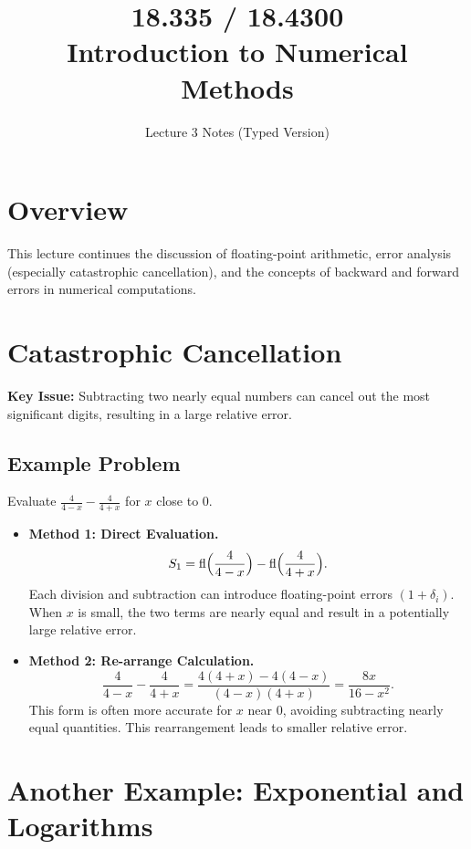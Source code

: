 \documentclass[12pt]{article}
\begin{document}
\title{18.335 / 18.4300 \\ Introduction to Numerical Methods}
\author{Lecture 3 Notes (Typed Version)}
\date{}
\maketitle

\section*{Overview}

This lecture continues the discussion of floating-point arithmetic, error analysis (especially catastrophic cancellation), and the concepts of backward and forward errors in numerical computations.

\section*{Catastrophic Cancellation}

\noindent
\textbf{Key Issue:} Subtracting two nearly equal numbers can cancel out the most significant digits, resulting in a large relative error.

\subsection*{Example Problem}

Evaluate $\displaystyle \frac{4}{4 - x} - \frac{4}{4 + x}$ for $x$ close to $0$.

\begin{itemize}
  \item \textbf{Method 1: Direct Evaluation.}
  \[
    S_1 = \mathrm{fl}\Bigl(\frac{4}{4 - x}\Bigr) - \mathrm{fl}\Bigl(\frac{4}{4 + x}\Bigr).
  \]
  Each division and subtraction can introduce floating-point errors $(1 + \delta_i)$. When $x$ is small, the two terms are nearly equal and result in a potentially large relative error.

  \item \textbf{Method 2: Re-arrange Calculation.}
  \[
    \frac{4}{4 - x} - \frac{4}{4 + x}
    = \frac{4(4 + x) - 4(4 - x)}{(4 - x)(4 + x)}
    = \frac{8x}{16 - x^2}.
  \]
  This form is often more accurate for $x$ near $0$, avoiding subtracting nearly equal quantities. This rearrangement leads to smaller relative error.
\end{itemize}

\section*{Another Example: Exponential and Logarithms}
\end{document}
